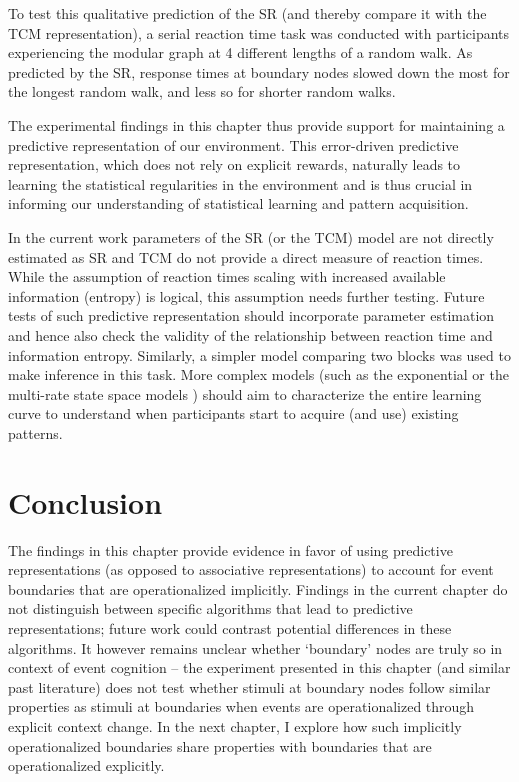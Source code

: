 To test this qualitative prediction of the SR (and thereby compare it with the TCM representation), a serial reaction time task was conducted with participants experiencing the modular graph at 4 different lengths of a random walk. As predicted by the SR, response times at boundary nodes slowed down the most for the longest random walk, and less so for shorter random walks. 

The experimental findings in this chapter thus provide support for maintaining a predictive representation of our environment. This error-driven predictive representation, which does not rely on explicit rewards, naturally leads to learning the statistical regularities in the environment and is thus crucial in informing our understanding of statistical learning and pattern acquisition. 

In the current work parameters of the SR (or the TCM) model are not directly estimated as SR and TCM do not provide a direct measure of reaction times. While the assumption of reaction times scaling with increased available information (entropy) is logical, this assumption needs further testing. Future tests of such predictive representation should incorporate parameter estimation and hence also check the validity of the relationship between reaction time and information entropy. Similarly, a simpler model comparing two blocks was used to make inference in this task. More complex models (such as the exponential or the multi-rate state space models \cite{savalia2024leap, smith2006interacting, mcdougle2015explicit}) should aim to characterize the entire learning curve to understand when participants start to acquire (and use) existing patterns.  

\section{Conclusion}
The findings in this chapter provide evidence in favor of using predictive representations (as opposed to associative representations) to account for event boundaries that are operationalized implicitly. Findings in the current chapter do not distinguish between specific algorithms that lead to predictive representations; future work could contrast potential differences in these algorithms. It however remains unclear whether `boundary' nodes are truly so in context of event cognition -- the experiment presented in this chapter (and similar past literature) does not test whether stimuli at boundary nodes follow similar properties as stimuli at boundaries when events are operationalized through explicit context change. In the next chapter, I explore how such implicitly operationalized boundaries share properties with boundaries that are operationalized explicitly. 